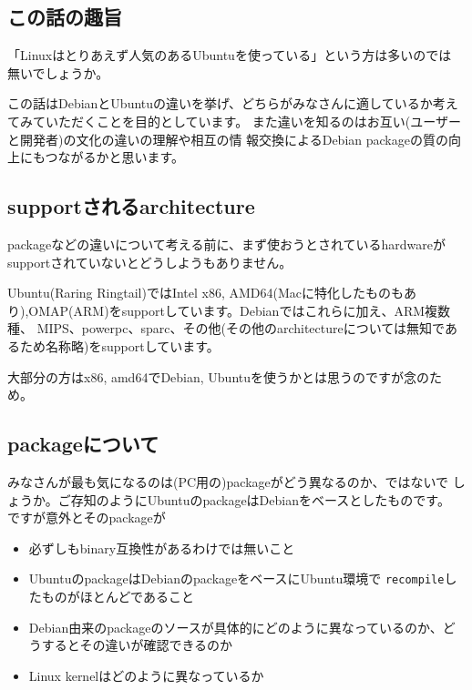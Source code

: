 \documentclass[mingoth,a4paper]{jsarticle}
\begin{document}
\clearpage
{}

\subsection{この話の趣旨}

「Linuxはとりあえず人気のあるUbuntuを使っている」という方は多いのでは
無いでしょうか。

この話はDebianとUbuntuの違いを挙げ、どちらがみなさんに適しているか考え
てみていただくことを目的としています。
また違いを知るのはお互い(ユーザーと開発者)の文化の違いの理解や相互の情
報交換によるDebian packageの質の向上にもつながるかと思います。

\subsection{supportされるarchitecture}

packageなどの違いについて考える前に、まず使おうとされているhardwareが
supportされていないとどうしようもありません。

Ubuntu(Raring Ringtail)ではIntel x86, AMD64(Macに特化したものもあ
り),OMAP(ARM)をsupportしています。Debianではこれらに加え、ARM複数種、
MIPS、powerpc、sparc、その他(その他のarchitectureについては無知であ
るため名称略)をsupportしています。

大部分の方はx86, amd64でDebian, Ubuntuを使うかとは思うのですが念のため。

\subsection{packageについて}

みなさんが最も気になるのは(PC用の)packageがどう異なるのか、ではないで
しょうか。ご存知のようにUbuntuのpackageはDebianをベースとしたものです。
ですが意外とそのpackageが

\begin{itemize}
\itemsep1pt\parskip0pt
\item
  必ずしもbinary互換性があるわけでは無いこと
\item
  UbuntuのpackageはDebianのpackageをベースにUbuntu環境で
  \texttt{recompile}したものがほとんどであること
\item
  Debian由来のpackageのソースが具体的にどのように異なっているのか、ど
  うするとその違いが確認できるのか
\item
  Linux kernelはどのように異なっているか
\end{itemize}
\end{document}
